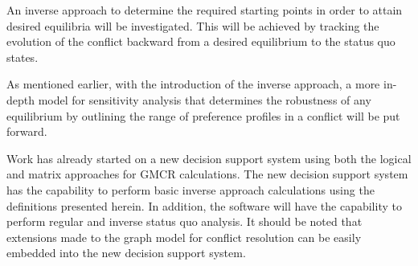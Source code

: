 \documentclass[letterpaper,12pt,titlepage,oneside,final]{book}
\begin{document}
An inverse approach to determine the required starting points in order to attain desired equilibria will be investigated. This will be achieved by tracking the evolution of the conflict backward from a desired equilibrium to the status quo states.


As mentioned earlier, with the introduction of the inverse approach, a more in-depth model for sensitivity analysis that determines the robustness of any equilibrium by outlining the range of preference profiles in a conflict will be put forward. 

Work has already started on a new decision support system using both the logical and matrix approaches for GMCR calculations. The new decision support system has the capability to perform basic inverse approach calculations using the definitions presented herein. In addition, the software will have the capability to perform regular and inverse status quo analysis. It should be noted that extensions made to the graph model for conflict resolution can be easily embedded into the new decision support system.
\end{document}
